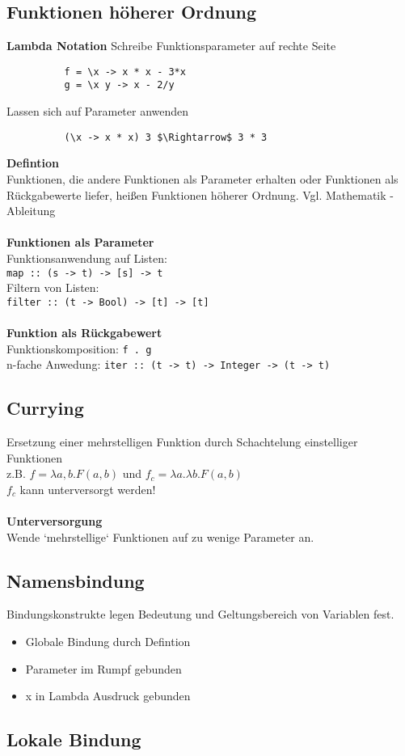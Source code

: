 \documentclass[10pt,a4paper]{article}
\def\code#1{\texttt{#1}}
\begin{document}
        \subsection{Funktionen höherer Ordnung}
        \textbf{Lambda Notation}
        Schreibe Funktionsparameter auf rechte Seite
        \begin{lstlisting}
          f = \x -> x * x - 3*x
          g = \x y -> x - 2/y
        \end{lstlisting}
        Lassen sich auf Parameter anwenden
        \begin{lstlisting}
          (\x -> x * x) 3 $\Rightarrow$ 3 * 3
        \end{lstlisting}
        \textbf{Defintion}\\
        Funktionen, die andere Funktionen als Parameter erhalten oder Funktionen als Rückgabewerte liefer, heißen Funktionen höherer Ordnung.
        Vgl. Mathematik - Ableitung\\\\
        \textbf{Funktionen als Parameter}\\
        Funktionsanwendung auf Listen:\\
        \code{map :: (s -> t) -> [s] -> t}\\
        Filtern von Listen:\\
        \code{filter :: (t -> Bool) -> [t] -> [t]}\\\\
        \textbf{Funktion als Rückgabewert}\\
        Funktionskomposition: \code{f . g}\\
        n-fache Anwedung: \code{iter :: (t -> t) -> Integer -> (t -> t)}

        \subsection{Currying}
        Ersetzung einer mehrstelligen Funktion durch Schachtelung einstelliger Funktionen\\
        z.B. \(f = \lambda a, b.F(a,b)\) und \(f_c = \lambda a.\lambda b. F(a, b)\)\\
        \(f_c\) kann unterversorgt werden!\\\\
        \textbf{Unterversorgung}\\
        Wende `mehrstellige` Funktionen auf zu wenige Parameter an.

        \subsection{Namensbindung}
        Bindungskonstrukte legen Bedeutung und Geltungsbereich von Variablen fest.
        \begin{itemize}
          \item Globale Bindung durch Defintion
          \item Parameter im Rumpf gebunden
          \item x in Lambda Ausdruck gebunden
        \end{itemize}

        \subsection{Lokale Bindung}
        
\end{document}
